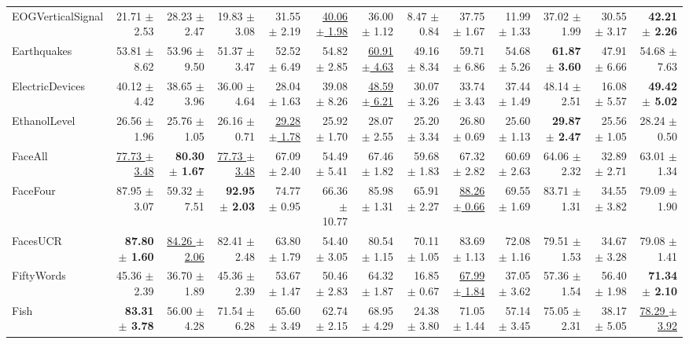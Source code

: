 \begin{landscape}
\begin{longtable}{lrrrrrrrrrrrr}
EOGVerticalSignal & 21.71 $\pm$ 2.53 & 28.23 $\pm$ 2.47 & 19.83 $\pm$ 3.08 & 31.55 $\pm$ 2.19 & \underline{40.06 $\pm$ 1.98} & 36.00 $\pm$ 1.12 & 8.47 $\pm$ 0.84 & 37.75 $\pm$ 1.67 & 11.99 $\pm$ 1.33 & 37.02 $\pm$ 1.99 & 30.55 $\pm$ 3.17 & \textbf{42.21 $\pm$ 2.26} \\
Earthquakes & 53.81 $\pm$ 8.62 & 53.96 $\pm$ 9.50 & 51.37 $\pm$ 3.47 & 52.52 $\pm$ 6.49 & 54.82 $\pm$ 2.85 & \underline{60.91 $\pm$ 4.63} & 49.16 $\pm$ 8.34 & 59.71 $\pm$ 6.86 & 54.68 $\pm$ 5.26 & \textbf{61.87 $\pm$ 3.60} & 47.91 $\pm$ 6.66 & 54.68 $\pm$ 7.63 \\
ElectricDevices & 40.12 $\pm$ 4.42 & 38.65 $\pm$ 3.96 & 36.00 $\pm$ 4.64 & 28.04 $\pm$ 1.63 & 39.08 $\pm$ 8.26 & \underline{48.59 $\pm$ 6.21} & 30.07 $\pm$ 3.26 & 33.74 $\pm$ 3.43 & 37.44 $\pm$ 1.49 & 48.14 $\pm$ 2.51 & 16.08 $\pm$ 5.57 & \textbf{49.42 $\pm$ 5.02} \\
EthanolLevel & 26.56 $\pm$ 1.96 & 25.76 $\pm$ 1.05 & 26.16 $\pm$ 0.71 & \underline{29.28 $\pm$ 1.78} & 25.92 $\pm$ 1.70 & 28.07 $\pm$ 2.55 & 25.20 $\pm$ 3.34 & 26.80 $\pm$ 0.69 & 25.60 $\pm$ 1.13 & \textbf{29.87 $\pm$ 2.47} & 25.56 $\pm$ 1.05 & 28.24 $\pm$ 0.50 \\
FaceAll & \underline{77.73 $\pm$ 3.48} & \textbf{80.30 $\pm$ 1.67} & \underline{77.73 $\pm$ 3.48} & 67.09 $\pm$ 2.40 & 54.49 $\pm$ 5.41 & 67.46 $\pm$ 1.82 & 59.68 $\pm$ 1.83 & 67.32 $\pm$ 2.82 & 60.69 $\pm$ 2.63 & 64.06 $\pm$ 2.32 & 32.89 $\pm$ 2.71 & 63.01 $\pm$ 1.34 \\
FaceFour & 87.95 $\pm$ 3.07 & 59.32 $\pm$ 7.51 & \textbf{92.95 $\pm$ 2.03} & 74.77 $\pm$ 0.95 & 66.36 $\pm$ 10.77 & 85.98 $\pm$ 1.31 & 65.91 $\pm$ 2.27 & \underline{88.26 $\pm$ 0.66} & 69.55 $\pm$ 1.69 & 83.71 $\pm$ 1.31 & 34.55 $\pm$ 3.82 & 79.09 $\pm$ 1.90 \\
FacesUCR & \textbf{87.80 $\pm$ 1.60} & \underline{84.26 $\pm$ 2.06} & 82.41 $\pm$ 2.48 & 63.80 $\pm$ 1.79 & 54.40 $\pm$ 3.05 & 80.54 $\pm$ 1.15 & 70.11 $\pm$ 1.05 & 83.69 $\pm$ 1.13 & 72.08 $\pm$ 1.16 & 79.51 $\pm$ 1.53 & 34.67 $\pm$ 3.28 & 79.08 $\pm$ 1.41 \\
FiftyWords & 45.36 $\pm$ 2.39 & 36.70 $\pm$ 1.89 & 45.36 $\pm$ 2.39 & 53.67 $\pm$ 1.47 & 50.46 $\pm$ 2.83 & 64.32 $\pm$ 1.87 & 16.85 $\pm$ 0.67 & \underline{67.99 $\pm$ 1.84} & 37.05 $\pm$ 3.62 & 57.36 $\pm$ 1.54 & 56.40 $\pm$ 1.98 & \textbf{71.34 $\pm$ 2.10} \\
Fish & \textbf{83.31 $\pm$ 3.78} & 56.00 $\pm$ 4.28 & 71.54 $\pm$ 6.28 & 65.60 $\pm$ 3.49 & 62.74 $\pm$ 2.15 & 68.95 $\pm$ 4.29 & 24.38 $\pm$ 3.80 & 71.05 $\pm$ 1.44 & 57.14 $\pm$ 3.45 & 75.05 $\pm$ 2.31 & 38.17 $\pm$ 5.05 & \underline{78.29 $\pm$ 3.92} \\

\end{longtable}
\end{landscape}
